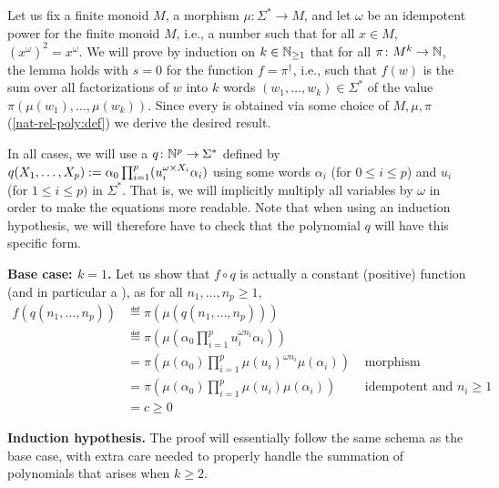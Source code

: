 \begin{proofof}
	Let us fix a finite monoid $M$, a morphism $\mu \colon \Sigma^* \to M$, and
	let $\omega$ be an idempotent power for the finite monoid $M$,
	i.e., a number such that for all $x \in M$,
	$(x^{\omega})^2 = x^{\omega}$.
	We will prove by induction on $k \in \mathbb{N}_{\geq 1}$
	that for all
	$\pi \colon M^k \to \mathbb{N}$,
	the lemma holds with $s = 0$ for the function
	$f = \pi^\dagger$, i.e., such that
	$f(w)$ is the sum over all factorizations of $w$
	into $k$ words $(w_1, \dots, w_k) \in \Sigma^*$
	of the value $\pi(\mu(w_1), \dots, \mu(w_k))$.
	Since every 
	is obtained via some choice of $M, \mu, \pi$ (\cref{nat-rel-poly:def})
	we derive the desired result.

	In all cases, we will use a  $q \colon \mathbb{N}^p \to
		\Sigma^*$ defined by $q(X_1, \dots, X_p) \mathrel{:=} \alpha_0 \prod_{i = 1}^p
		(u_i^{\omega \times X_i} \alpha_i)$ using some words $\alpha_i$ (for $0 \leq i
		\leq p$) and $u_i$ (for $1 \leq i \leq p)$ in $\Sigma^*$. That is, we will
	implicitly multiply all variables by $\omega$ in order to make the
	equations more readable. Note that when using an induction hypothesis, we
	will therefore have to check that the polynomial $q$ will have this
	specific form.

	\textbf{Base case: $k = 1$.}
	Let us show that $f \circ q$ is
	actually a constant (positive) function (and in particular a ), as for
	all $n_1, \dots, n_p \geq 1$,
	\begin{align*}
		f(q(n_1, \dots, n_p))
		 & \eqdef \pi\left(\mu(q(n_1, \dots, n_p))\right)                                      \\
		 & \eqdef \pi\left(\mu(\alpha_0 \prod_{i = 1}^p u_i^{\omega n_i} \alpha_i)\right)
		\\
		 & = \pi\left(\mu(\alpha_0) \prod_{i = 1}^p \mu(u_i)^{\omega n_i} \mu(\alpha_i)\right)
		 & \text{ morphism }
		\\
		 & = \pi\left(\mu(\alpha_0) \prod_{i = 1}^p \mu(u_i) \mu(\alpha_i)\right)
		 & \text{ idempotent and } n_i \geq 1                                                  \\
		 & = c \geq 0
	\end{align*}

	\textbf{Induction hypothesis.}
	The proof will essentially follow the same schema as the base case,
	with extra care needed to properly handle the summation of polynomials
	that arises when $k \geq 2$.


\end{proofof}
